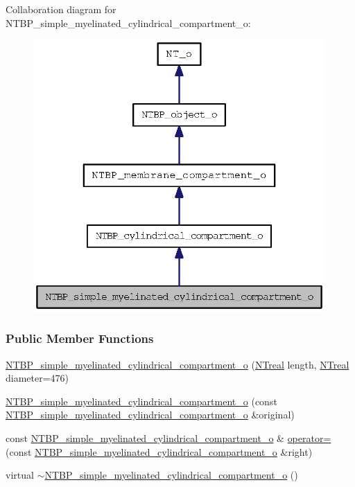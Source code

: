 Collaboration diagram for NTBP\_\-simple\_\-myelinated\_\-cylindrical\_\-compartment\_\-o:
\nopagebreak
\begin{figure}[H]
\begin{center}
\leavevmode
\includegraphics[width=316pt]{class_n_t_b_p__simple__myelinated__cylindrical__compartment__o__coll__graph}
\end{center}
\end{figure}
\subsubsection*{Public Member Functions}
\begin{DoxyCompactItemize}
\item 
\hyperlink{class_n_t_b_p__simple__myelinated__cylindrical__compartment__o_aaf45f305e177800528afc8dcec1de808}{NTBP\_\-simple\_\-myelinated\_\-cylindrical\_\-compartment\_\-o} (\hyperlink{nt__types_8h_a814a97893e9deb1eedcc7604529ba80d}{NTreal} length, \hyperlink{nt__types_8h_a814a97893e9deb1eedcc7604529ba80d}{NTreal} diameter=476)
\item 
\hyperlink{class_n_t_b_p__simple__myelinated__cylindrical__compartment__o_ab5b4283dc747e7afdc755a3e1cdd486a}{NTBP\_\-simple\_\-myelinated\_\-cylindrical\_\-compartment\_\-o} (const \hyperlink{class_n_t_b_p__simple__myelinated__cylindrical__compartment__o}{NTBP\_\-simple\_\-myelinated\_\-cylindrical\_\-compartment\_\-o} \&original)
\item 
const \hyperlink{class_n_t_b_p__simple__myelinated__cylindrical__compartment__o}{NTBP\_\-simple\_\-myelinated\_\-cylindrical\_\-compartment\_\-o} \& \hyperlink{class_n_t_b_p__simple__myelinated__cylindrical__compartment__o_aba52b719f1e96e9fdee5f631e0ae907c}{operator=} (const \hyperlink{class_n_t_b_p__simple__myelinated__cylindrical__compartment__o}{NTBP\_\-simple\_\-myelinated\_\-cylindrical\_\-compartment\_\-o} \&right)
\item 
virtual \hyperlink{class_n_t_b_p__simple__myelinated__cylindrical__compartment__o_aa06de2a8a78e945f7d23b07c1c770e61}{$\sim$NTBP\_\-simple\_\-myelinated\_\-cylindrical\_\-compartment\_\-o} ()
\end{DoxyCompactItemize}


